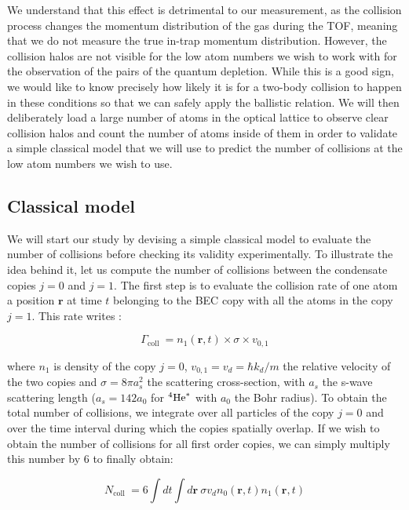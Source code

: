 We understand that this effect is detrimental to our measurement, as the collision process changes the momentum distribution of the gas during the TOF, meaning that we do not measure the true in-trap momentum distribution. However, the collision halos are not visible for the low atom numbers we wish to work with for the observation of the \kmk pairs of the quantum depletion. While this is a good sign, we would like to know precisely how likely it is for a two-body collision to happen in these conditions so that we can safely apply the ballistic relation. We will then deliberately load a large number of atoms in the optical lattice to observe clear collision halos and count the number of atoms inside of them in order to validate a simple classical model that we will use to predict the number of collisions at the low atom numbers we wish to use.

\subsection{Classical model}

We will start our study by devising a simple classical model to evaluate the number of collisions before checking its validity experimentally. To illustrate the idea behind it, let us compute the number of collisions between the condensate copies $j=0$ and $j=1$. The first step is to evaluate the collision rate of one atom a position $\bm{r}$ at time $t$ belonging to the BEC copy with all the atoms in the copy $j=1$. This rate writes \cite{chikkatur2000suppression,perrin:tel-00244641}:

\begin{equation}
    \Gamma_{\text {coll }}=n_{1}(\bm{r}, t) \times \sigma \times v_{0,1}
\end{equation}

\noindent where $n_1$ is density of the copy $j=0$, $v_{0,1}=v_d=\hbar k_d/m$ the relative velocity of the two copies and $\sigma= 8 \pi a_s^2$ the scattering cross-section, with $a_s$ the s-wave scattering length ($a_s = 142 a_0$ for $^4\mathrm{He}^*$ with $a_0$ the Bohr radius). To obtain the total number of collisions, we integrate over all particles of the copy $j=0$ and over the time interval during which the copies spatially overlap. If we wish to obtain the number of collisions for all first order copies, we can simply multiply this number by $6$ to finally obtain:

\begin{equation}
    N_{\text {coll }}=6 \int d t \int d \bm{r} \ \sigma v_{d} n_{0}(\bm{r}, t) n_{1}(\bm{r}, t)
    \label{eq:coll_model_general}
\end{equation}


